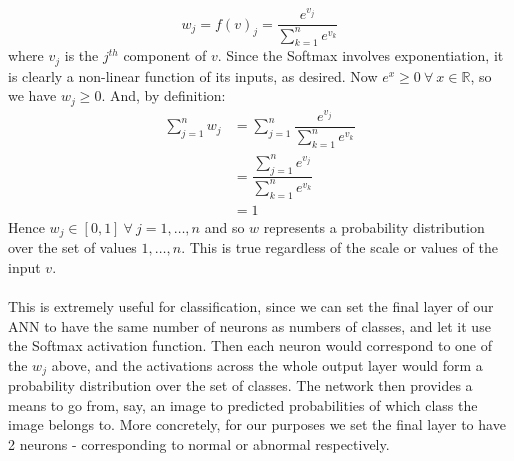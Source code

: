 \documentclass[11pt]{article} %
\theoremstyle{plain}
\theoremstyle{definition}
\begin{document}
\[w_j = f(v)_j = \dfrac{e^{v_j}}{\sum_{k=1}^n e^{v_k}} \] 
where \(v_j\) is the \(j^{th}\) component of \(v\). Since the Softmax involves exponentiation, it is clearly a non-linear function of its inputs, as desired. Now \({e^x}\geq0 \ \forall \ x \in \mathbb{R} \), so we have \(w_j\geq0\). And, by definition:
\begin{align*}
\sum_{j=1}^n w_j &= \sum_{j=1}^n \dfrac{e^{v_j}}{\sum_{k=1}^n e^{v_k}} \\
&= \dfrac{\sum_{j=1}^n e^{v_j}}{\sum_{k=1}^n e^{v_k}} \\
&= 1 
\end{align*}
Hence \(w_j \in [0,1] \ \forall \ j=1, \ldots,n\) and so \(w\) represents a probability distribution over the set of values \(1, \ldots,n\). This is true regardless of the scale or values of the input \(v\).  
\\
\\
\noindent
This is extremely useful for classification, since we can set the final layer of our ANN to have the same number of neurons as numbers of classes, and let it use the Softmax activation function. Then each neuron would correspond to one of the \(w_j\) above, and the activations across the whole output layer would form a probability distribution over the set of classes. The network then provides a means to go from, say, an image to predicted probabilities of which class the image belongs to. More concretely, for our purposes we set the final layer to have 2 neurons - corresponding to normal or abnormal respectively.

\newpage
\end{document}
